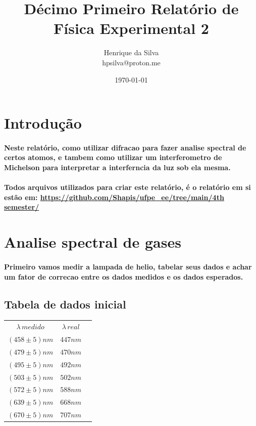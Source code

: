 \documentclass[12pt,twoside, a4paper, twocolumn]{article}
\title{Décimo Primeiro Relatório de Física Experimental 2}
\author{Henrique da Silva \\ hpsilva@proton.me}
\date{\today}
\begin{document}
\maketitle
{}
\newpage
\tableofcontents
\newpage

\section{Introdução}

\paragraph*{Neste relatório, como utilizar difracao para fazer analise spectral de certos atomos, e tambem como utilizar um interferometro de Michelson para interpretar a interferncia da luz sob ela mesma.}

\paragraph*{Todos arquivos utilizados para criar este relatório, é o relatório em si estão em:  \url{https://github.com/Shapis/ufpe_ee/tree/main/4th semester/}}


\section{Analise spectral de gases}

\paragraph*{Primeiro vamos medir a lampada de helio, tabelar seus dados e achar um fator de correcao entre os dados medidos e os dados esperados.}

\subsection{Tabela de dados inicial}



\begin{center}
  \begin{tabular}{ |c|c|c| }
    \hline
    $\lambda \, medido$ & $\lambda \, real$ \\
    $(458 \pm 5)nm$     & $447nm$           \\
    $(479 \pm 5)nm$     & $470nm$           \\
    $(495 \pm 5)nm$     & $492nm$           \\
    $(503 \pm 5)nm$     & $502nm$           \\
    $(572 \pm 5)nm$     & $588nm$           \\
    $(639 \pm 5)nm$     & $668nm$           \\
    $(670 \pm 5)nm$     & $707nm$           \\
    \hline
  \end{tabular}
\end{center}
\end{document}
